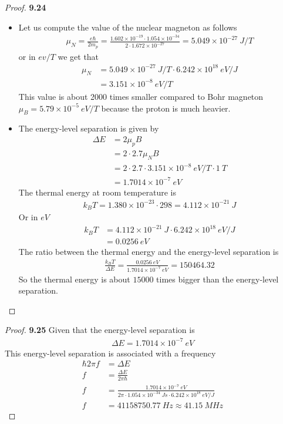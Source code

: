 \documentclass[11pt]{article}
\newcommand{\sci}[1]{\times 10^{#1}}
\theoremstyle{definition}
\begin{document}
\cleardoublepage
\begin{proof}{\textbf{9.24}}
\begin{itemize}
\item [\textbf{(a)}] Let us compute the value of the nuclear magneton as
follows
\begin{align*}
    \mu_N = \frac{e\hbar}{2m_p}
    = \frac{1.602\sci{-19}\cdot 1.054\sci{-34}}{2\cdot 1.672\sci{-27}}
    = 5.049 \sci{-27}~J/T
\end{align*}
or in $ev/T$ we get that
\begin{align*}
    \mu_N &= 5.049 \sci{-27}~J/T \cdot 6.242\sci{18}~eV/J\\
    &= 3.151\sci{-8} ~eV/T
\end{align*}
This value is about 2000 times smaller compared to Bohr magneton
$\mu_B = 5.79\sci{-5}~eV/T$ because the proton is much heavier.

\item [\textbf{(b)}] The energy-level separation is given by
\begin{align*}
    \Delta E &= 2 \mu_p B\\
    &= 2\cdot 2.7\mu_N B\\
    &= 2 \cdot 2.7 \cdot 3.151\sci{-8} ~eV/T \cdot 1~T\\
    &= 1.7014\sci{-7} ~eV
\end{align*}
The thermal energy at room temperature is
\begin{align*}
    k_B T = 1.380\sci{-23} \cdot 298 = 4.112\sci{-21}~J
\end{align*}
Or in $eV$
\begin{align*}
    k_B T &= 4.112\sci{-21}~J \cdot 6.242\sci{18}~eV/J\\
    &= 0.0256 ~eV
\end{align*}
The ratio between the thermal energy and the energy-level separation is
\begin{align*}
    \frac{k_B T}{\Delta E} = \frac{0.0256 ~eV}{1.7014\sci{-7} ~eV}
    = 150464.32
\end{align*}
So the thermal energy is about $15000$ times bigger than the energy-level
separation.
\end{itemize}
\end{proof}

\cleardoublepage
\begin{proof}{\textbf{9.25}}
Given that the energy-level separation is 
\begin{align*}
    \Delta E = 1.7014\sci{-7} ~eV
\end{align*}
This energy-level separation is associated with a frequency
\begin{align*}
    \hbar 2\pi f &= \Delta E\\
    f &= \frac{\Delta E}{2\pi \hbar}\\
    f &= \frac{1.7014\sci{-7} ~eV}{2\pi \cdot 1.054\sci{-34} ~Js \cdot  6.242\sci{18}~eV/J}\\
    f &= 41158750.77~Hz \approx 41.15~MHz
\end{align*}
\end{proof}
\end{document}

